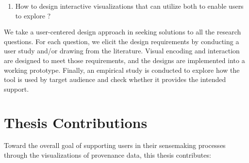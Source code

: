 \begin{enumerate}
	\item How to design interactive visualizations that can utilize both  to enable users to explore ?
	
\end{enumerate}

We take a user-centered design approach in seeking solutions to all the research questions. For each question, we elicit the design requirements by conducting a user study and/or drawing from the literature. Visual encoding and interaction are designed to meet those requirements, and the designs are implemented into a working prototype. Finally, an empirical study is conducted to explore how the tool is used by target audience and check whether it provides the intended support. 

%

\section{Thesis Contributions}
Toward the overall goal of supporting users in their sensemaking processes through the visualizations of provenance data, this thesis contributes:

